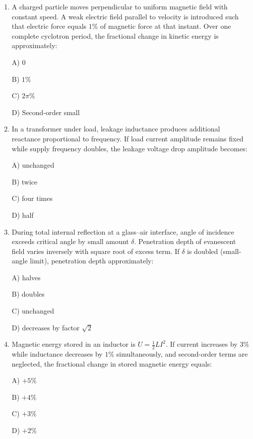 \documentclass[12pt]{article}
\begin{document}
\begin{enumerate}[leftmargin=*]
B) Capacitive because \(X_C>X_L\)  

C) Resistive because \(R\) dominates  

D) At maximum current condition  

\item A charged particle moves perpendicular to uniform magnetic field with constant speed. A weak electric field parallel to velocity is introduced such that electric force equals \(1\%\) of magnetic force at that instant. Over one complete cyclotron period, the fractional change in kinetic energy is approximately:  

A) \(0\)  

B) \(1\%\)  

C) \(2\pi\%\)  

D) Second-order small  

\item In a transformer under load, leakage inductance produces additional reactance proportional to frequency. If load current amplitude remains fixed while supply frequency doubles, the leakage voltage drop amplitude becomes:  

A) unchanged

B) twice  

C) four times  

D) half  

\item During total internal reflection at a glass–air interface, angle of incidence exceeds critical angle by small amount \(\delta\). Penetration depth of evanescent field varies inversely with square root of excess term. If \(\delta\) is doubled (small-angle limit), penetration depth approximately:  

A) halves  

B) doubles  

C) unchanged  

D) decreases by factor \(\sqrt{2}\)  

\item Magnetic energy stored in an inductor is \(U=\frac12 LI^2\). If current increases by \(3\%\) while inductance decreases by \(1\%\) simultaneously, and second-order terms are neglected, the fractional change in stored magnetic energy equals:  

A) \(+5\%\)  

B) \(+4\%\)  

C) \(+3\%\)  

D) \(+2\%\)  

\end{enumerate}
\end{document}
